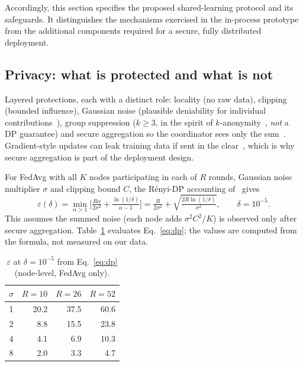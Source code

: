 \documentclass[11pt,a4paper]{article}
\newcommand{\hdr}{\rowcolor{emblue!15}}
\begin{document}
Accordingly, this section specifies the proposed shared-learning
protocol and its safeguards. It distinguishes the mechanisms exercised
in the in-process prototype from the additional components required
for a secure, fully distributed deployment.
\subsection{Privacy: what is protected and what is not}

Layered protections, each with a distinct role: locality (no raw data), clipping (bounded influence), Gaussian noise (plausible deniability for individual contributions~\cite{dwork2014,abadi2016}), group suppression ($k\!\ge\!3$, in the spirit of $k$-anonymity~\cite{sweeney2002}, \emph{not} a DP guarantee) and secure aggregation so the coordinator sees only the sum~\cite{bonawitz2017}. Gradient-style updates can leak training data if sent in the clear~\cite{zhu2019}, which is why secure aggregation is part of the deployment design.

For FedAvg with all $K$ nodes participating in each of $R$ rounds, Gaussian noise multiplier $\sigma$ and clipping bound $C$, the R\'enyi-DP accounting of~\cite{mironov2017} gives
\begin{equation}
 \varepsilon(\delta)=\min_{\alpha>1}\Big[\tfrac{R\alpha}{2\sigma^2}+\tfrac{\ln(1/\delta)}{\alpha-1}\Big]
 =\tfrac{R}{2\sigma^2}+\sqrt{\tfrac{2R\ln(1/\delta)}{\sigma^2}},\qquad\delta=10^{-5}.
 \label{eq:dp}
\end{equation}
This assumes the summed noise (each node adds $\sigma^2C^2/K$) is observed only after secure aggregation. Table~\ref{tab:eps} evaluates Eq.~\eqref{eq:dp}; the values are computed from the formula, not measured on our data.

\begin{table}[H]
\centering\small
\caption{$\varepsilon$ at $\delta=10^{-5}$ from Eq.~\eqref{eq:dp} (node-level, FedAvg only).}
\label{tab:eps}
\begin{tabular}{@{}c rrr@{}}
\toprule\hdr
$\sigma$ & $R=10$ & $R=26$ & $R=52$ \\
\midrule
1 & 20.2 & 37.5 & 60.6 \\
2 & 8.8 & 15.5 & 23.8 \\
4 & 4.1 & 6.9 & 10.3 \\
8 & 2.0 & 3.3 & 4.7 \\
\bottomrule
\end{tabular}
\end{table}
\end{document}
